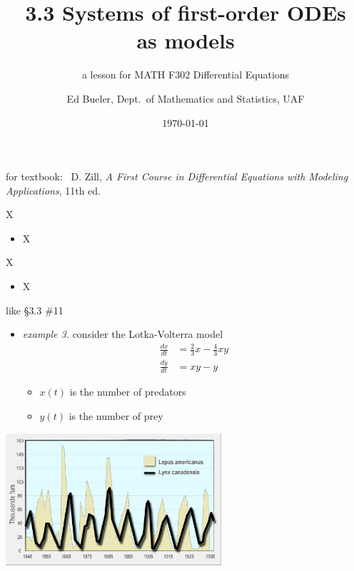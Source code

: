 \documentclass[urlcolor=blue,dvipsnames]{beamer}
\title{3.3 Systems of first-order ODEs \\ as models}
\subtitle{a lesson for MATH F302 Differential Equations}
\author{Ed Bueler, Dept.~of Mathematics and Statistics, UAF}
\date{\tiny \today}
\begin{document}
\renewcommand{\thefootnote}{{\color{green} \arabic{footnote}}}

\begin{frame}
\titlepage

\centerline{\tiny for textbook: \, D. Zill, \emph{A First Course in Differential Equations with Modeling Applications}, 11th ed.}
\end{frame}

\newcommand{\LL}[1]{\mathcal{L}\left\{#1\right\}}
\newcommand{\LLi}[1]{\mathcal{L}^{-1}\left\{#1\right\}}


\begin{frame}{X}

\begin{itemize}
\item X
\end{itemize}
\end{frame}


\begin{frame}{X}

\begin{itemize}
\item X
\end{itemize}
\end{frame}


\begin{frame}{like \S3.3 \#11}

\begin{itemize}
\item \emph{example 3.}  consider the Lotka-Volterra model
\begin{align*}
\frac{dx}{dt} &= \frac{2}{3} x - \frac{4}{3} xy \\
\frac{dy}{dt} &= xy - y
\end{align*}

\vspace{-2mm}
    \begin{itemize}
    \item $x(t)$ is the number of predators
    \item $y(t)$ is the number of prey
    \end{itemize}
\end{itemize}

\bigskip
\hfill \includegraphics[width=0.6\textwidth]{figs/hares-lynx}
\end{frame}
\end{document}
